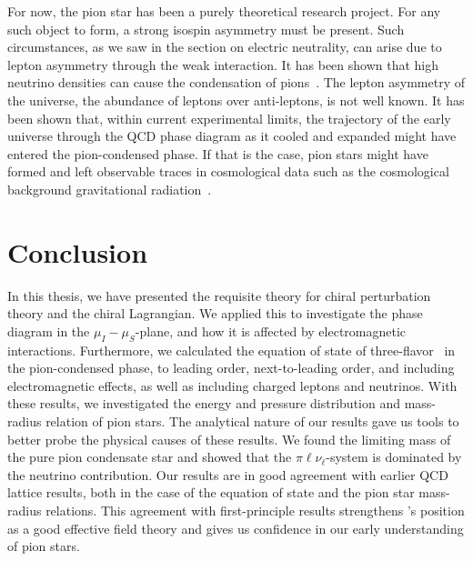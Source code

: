 For now, the pion star has been a purely theoretical research project.
For any such object to form, a strong isospin asymmetry must be present.
Such circumstances, as we saw in the section on electric neutrality, can arise due to lepton asymmetry through the weak interaction.
It has been shown that high neutrino densities can cause the condensation of pions~\autocite{abukiPionCondensationDense2009}.
The lepton asymmetry of the universe, the abundance of leptons over anti-leptons, is not well known.
It has been shown that, within current experimental limits, the trajectory of the early universe through the QCD phase diagram as it cooled and expanded might have entered the pion-condensed phase.
If that is the case, pion stars might have formed and left observable traces in cosmological data such as the cosmological background gravitational radiation~\autocite{vovchenkoPionCondensationEarly2021,wygasCosmicQCDEpoch2018}.



\section{Conclusion}


In this thesis, we have presented the requisite theory for chiral perturbation theory and the chiral Lagrangian.
We applied this to investigate the phase diagram in the $\mu_I-\mu_S$-plane, and how it is affected by electromagnetic interactions.
Furthermore, we calculated the equation of state of three-flavor \chpt\, in the pion-condensed phase, to leading order, next-to-leading order, and including electromagnetic effects, as well as including charged leptons and neutrinos.
With these results, we investigated the energy and pressure distribution and mass-radius relation of pion stars.
The analytical nature of our results gave us tools to better probe the physical causes of these results.
We found the limiting mass of the pure pion condensate star and showed that the $\pi\ell\nu_\ell$-system is dominated by the neutrino contribution.
Our results are in good agreement with earlier QCD lattice results, both in the case of the equation of state and the pion star mass-radius relations.
This agreement with first-principle results strengthens \chpt's position as a good effective field theory and gives us confidence in our early understanding of pion stars.
